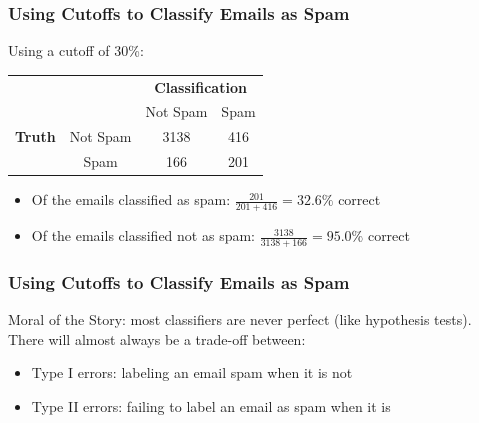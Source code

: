 \documentclass[handout]{beamer}
\newcommand{\blue}[1]{\textcolor{blue2}{#1}}
\begin{document}
\begin{frame}[fragile]
\frametitle{Using Cutoffs to Classify Emails as Spam}

Using a cutoff of 30\%:
\begin{center}
  \begin{tabular}{cc|cc}
     \multicolumn{2}{c}{}  & \multicolumn{2}{c}{\textbf{Classification}} \\ 
     &  & Not Spam & Spam \\ 
\hline
    \textbf{Truth} & Not Spam & 3138 & 416\\
     & Spam & 166 & 201\\ 
    \hline
  \end{tabular}
\end{center}
%
%
\pause
\begin{itemize}
\item Of the emails classified as spam:  $\frac{201}{201+416} = 32.6\%$ correct
\item Of the emails classified not as spam:  $\frac{3138}{3138+166} = 95.0\%$ correct
\end{itemize}

\end{frame}


\begin{frame}[fragile]
\frametitle{Using Cutoffs to Classify Emails as Spam}

%
%
\blue{Moral of the Story}:  most classifiers are never perfect (like hypothesis tests).  There will almost always be a trade-off between:  
\begin{itemize}
\item Type I errors:  labeling an email spam when it is not
\item Type II errors:  failing to label an email as spam when it is 
\end{itemize}

\end{frame}
\end{document}
